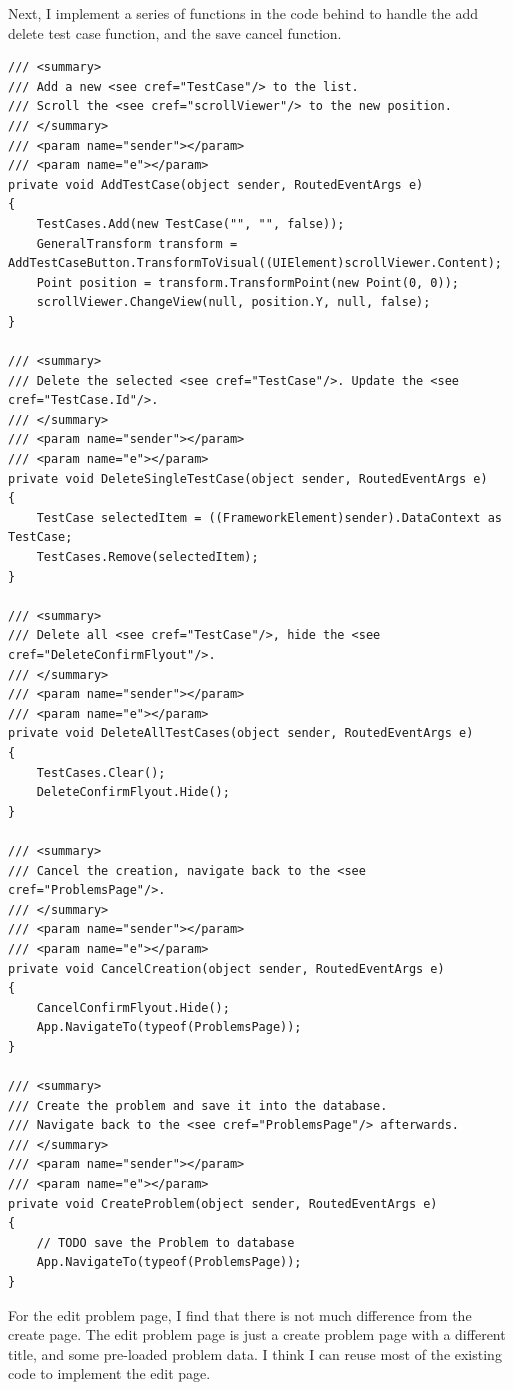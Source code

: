 \documentclass[a4paper]{report}
\begin{document}
Next, I implement a series of functions in the code behind to handle the add delete test case function, and the save cancel function.

\begin{verbatim}
/// <summary>
/// Add a new <see cref="TestCase"/> to the list.
/// Scroll the <see cref="scrollViewer"/> to the new position.
/// </summary>
/// <param name="sender"></param>
/// <param name="e"></param>
private void AddTestCase(object sender, RoutedEventArgs e)
{
    TestCases.Add(new TestCase("", "", false));
    GeneralTransform transform = AddTestCaseButton.TransformToVisual((UIElement)scrollViewer.Content);
    Point position = transform.TransformPoint(new Point(0, 0));
    scrollViewer.ChangeView(null, position.Y, null, false);
}

/// <summary>
/// Delete the selected <see cref="TestCase"/>. Update the <see cref="TestCase.Id"/>.
/// </summary>
/// <param name="sender"></param>
/// <param name="e"></param>
private void DeleteSingleTestCase(object sender, RoutedEventArgs e)
{
    TestCase selectedItem = ((FrameworkElement)sender).DataContext as TestCase;
    TestCases.Remove(selectedItem);
}

/// <summary>
/// Delete all <see cref="TestCase"/>, hide the <see cref="DeleteConfirmFlyout"/>.
/// </summary>
/// <param name="sender"></param>
/// <param name="e"></param>
private void DeleteAllTestCases(object sender, RoutedEventArgs e)
{
    TestCases.Clear();
    DeleteConfirmFlyout.Hide();
}

/// <summary>
/// Cancel the creation, navigate back to the <see cref="ProblemsPage"/>.
/// </summary>
/// <param name="sender"></param>
/// <param name="e"></param>
private void CancelCreation(object sender, RoutedEventArgs e)
{
    CancelConfirmFlyout.Hide();
    App.NavigateTo(typeof(ProblemsPage));
}

/// <summary>
/// Create the problem and save it into the database.
/// Navigate back to the <see cref="ProblemsPage"/> afterwards.
/// </summary>
/// <param name="sender"></param>
/// <param name="e"></param>
private void CreateProblem(object sender, RoutedEventArgs e)
{
    // TODO save the Problem to database
    App.NavigateTo(typeof(ProblemsPage));
}
\end{verbatim}

For the edit problem page, I find that there is not much difference from the create page. The edit problem page is just a create problem page with a different title, and some pre-loaded problem data. I think I can reuse most of the existing code to implement the edit page.
\end{document}
